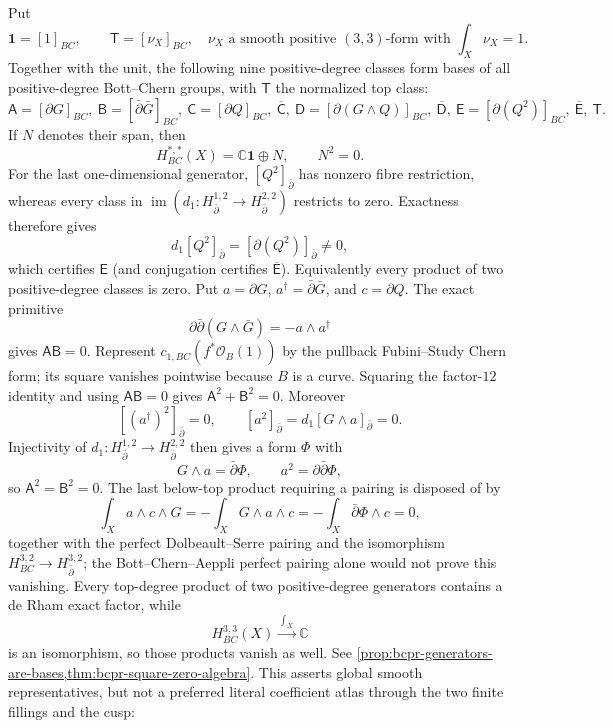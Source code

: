 \begin{enumerate}[leftmargin=1.8em,itemsep=.65em]
Put
\[
 \mathbf1=[1]_{BC},\qquad
 \mathsf T=[\nu_X]_{BC},
 \quad \nu_X\text{ a smooth positive }(3,3)\text{-form with }
 \int_X\nu_X=1.
\]
Together with the unit, the following nine positive-degree classes form
bases of all positive-degree Bott--Chern groups, with $\mathsf T$ the
normalized top class:
\[
 \mathsf A=[\partial G]_{BC},\ \mathsf B=[\bar\partial\bar G]_{BC},\
 \mathsf C=[\partial Q]_{BC},\ \overline{\mathsf C},\
 \mathsf D=[\partial(G\wedge Q)]_{BC},\ \overline{\mathsf D},\
 \mathsf E=[\partial(Q^2)]_{BC},\ \overline{\mathsf E},\ \mathsf T.
\]
If $N$ denotes their span, then
\[
 H^{*,*}_{BC}(X)=\mathbb C\mathbf1\oplus N,
 \qquad N^2=0.
\]
For the last one-dimensional generator,
$[Q^2]_{\bar\partial}$ has nonzero fibre restriction, whereas every class
in
$\operatorname{im}(d_1:H^{1,2}_{\bar\partial}\to
H^{2,2}_{\bar\partial})$ restricts to zero.  Exactness therefore gives
\[
 d_1[Q^2]_{\bar\partial}
 =[\partial(Q^2)]_{\bar\partial}\ne0,
\]
which certifies $\mathsf E$ (and conjugation certifies
$\overline{\mathsf E}$).
Equivalently every product of two positive-degree classes is zero.  Put
$a=\partial G$, $a^\dagger=\bar\partial\bar G$, and $c=\partial Q$.
The exact primitive
\[
 \partial\bar\partial(G\wedge\bar G)=-a\wedge a^\dagger
\]
gives $\mathsf A\mathsf B=0$.  Represent
$c_{1,BC}(f^*\mathcal O_B(1))$ by the pullback Fubini--Study Chern form;
its square vanishes pointwise because $B$ is a curve.  Squaring the
factor-$12$ identity and using $\mathsf A\mathsf B=0$ gives
$\mathsf A^2+\mathsf B^2=0$.  Moreover
\[
 [(a^\dagger)^2]_{\bar\partial}=0,\qquad
 [a^2]_{\bar\partial}=d_1[G\wedge a]_{\bar\partial}=0.
\]
Injectivity of
$d_1:H^{1,2}_{\bar\partial}\to H^{2,2}_{\bar\partial}$ then gives a form
$\Phi$ with
\[
 G\wedge a=\bar\partial\Phi,\qquad
 a^2=\partial\bar\partial\Phi,
\]
so $\mathsf A^2=\mathsf B^2=0$.  The last below-top product requiring a
pairing is disposed of by
\[
 \int_Xa\wedge c\wedge G
 =-\int_XG\wedge a\wedge c
 =-\int_X\bar\partial\Phi\wedge c=0,
\]
together with the perfect Dolbeault--Serre pairing and the isomorphism
$H^{3,2}_{BC}\to H^{3,2}_{\bar\partial}$; the
Bott--Chern--Aeppli perfect pairing alone would not prove this vanishing.
Every top-degree product of two positive-degree generators contains a de
Rham exact factor, while
\[
 H^{3,3}_{BC}(X)\xrightarrow{\ \int_X\ }\mathbb C
\]
is an isomorphism, so those products vanish as well.  See
\cref{prop:bcpr-generators-are-bases,thm:bcpr-square-zero-algebra}.  This
asserts global smooth representatives, but not a preferred literal
coefficient atlas through the two finite fillings and the cusp:

\end{enumerate}
